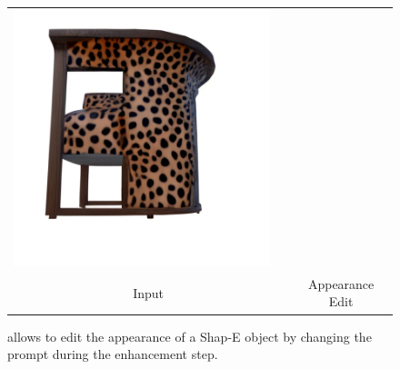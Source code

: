 \begin{figure}
{\begin{tabular}{cccc}
        \includegraphics[width=0.22\linewidth]{images/editings/appearance_edit/chair/chair_test_2_75_steps_batch_0_a_leopard_print_leather_chair_tile_1.png} \\
        \multicolumn{2}{c}{Input} & \multicolumn{2}{c}{Appearance Edit}
    \end{tabular}
    }
    \vspace{-6pt}
    \caption{
    \ourname{} allows to edit the appearance of a Shap-E object by changing the prompt during the enhancement step. 
    }
    \vspace{-14pt}
    \label{fig:edits-appearance}
\end{figure}